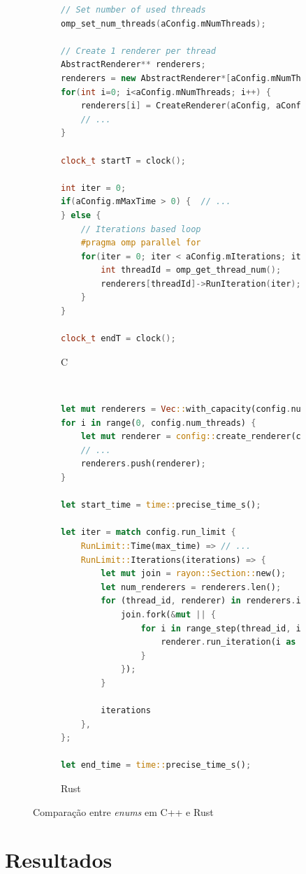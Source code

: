 \documentclass[tg]{mdtufsm}
\def\Cpp{{C\nolinebreak[4]\raisebox{.20ex}{\small\bf++}}}
\begin{document}
\begin{figure}
	\centering
	\begin{subfigure}[t]{0.48\textwidth}
\begin{lstlisting}[language=C++]
// Set number of used threads
omp_set_num_threads(aConfig.mNumThreads);

// Create 1 renderer per thread
AbstractRenderer** renderers;
renderers = new AbstractRenderer*[aConfig.mNumThreads];
for(int i=0; i<aConfig.mNumThreads; i++) {
	renderers[i] = CreateRenderer(aConfig, aConfig.mBaseSeed + i);
	// ...
}

clock_t startT = clock();

int iter = 0;
if(aConfig.mMaxTime > 0) {	// ...
} else {
	// Iterations based loop
	#pragma omp parallel for
	for(iter = 0; iter < aConfig.mIterations; iter++) {
		int threadId = omp_get_thread_num();
		renderers[threadId]->RunIteration(iter);
	}
}

clock_t endT = clock();
\end{lstlisting}
		\caption{\Cpp}
	\end{subfigure}%
	~~~
	\begin{subfigure}[t]{0.48\textwidth}
\begin{lstlisting}[language=Rust]
let mut renderers = Vec::with_capacity(config.num_threads as uint);
for i in range(0, config.num_threads) {
	let mut renderer = config::create_renderer(config, config.base_seed + i as u32);
	// ...
	renderers.push(renderer);
}

let start_time = time::precise_time_s();

let iter = match config.run_limit {
	RunLimit::Time(max_time) => // ...
	RunLimit::Iterations(iterations) => {
		let mut join = rayon::Section::new();
		let num_renderers = renderers.len();
		for (thread_id, renderer) in renderers.iter_mut().enumerate() {
			join.fork(&mut || {
				for i in range_step(thread_id, iterations, num_renderers) {
					renderer.run_iteration(i as u32);
				}
			});
		}

		iterations
	},
};

let end_time = time::precise_time_s();
\end{lstlisting}
		\caption{Rust}
	\end{subfigure}
	\caption{Comparação entre \emph{enums} em C++ e Rust}
	\label{code:parallel}
\end{figure}

\chapter{Resultados}
\end{document}
